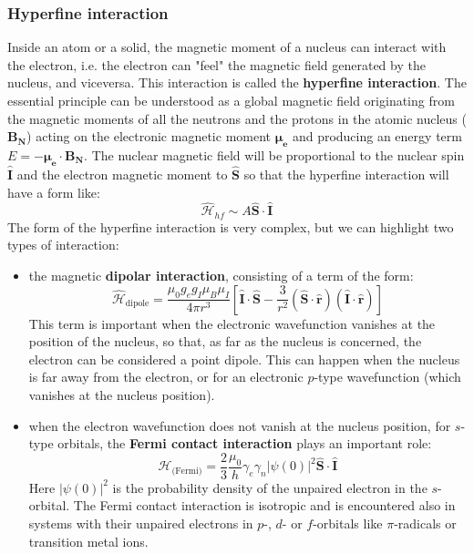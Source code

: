 \documentclass[a4paper,11pt]{article}
\begin{document}
\subsubsection{Hyperfine interaction}
Inside an atom or a solid, the magnetic moment of a nucleus can interact with the electron, i.e. the electron can "feel" the magnetic field generated by the nucleus, and viceversa. This interaction is called the {\bf hyperfine interaction}. The essential principle can be understood as a global magnetic field originating from the magnetic moments of all the neutrons and the protons in the atomic nucleus ($\mathbf{B_N}$) acting on the electronic magnetic moment $\mathbf{\mu_e}$ and producing an energy term $E = - \mathbf{\mu_e} \cdot \mathbf{B_N}$. The nuclear magnetic field will be proportional to the nuclear spin $\hat{\mathbf{I}}$ and the electron magnetic moment to $\hat{\mathbf{S}}$ so that the hyperfine interaction will have a form like:
\begin{equation}
    \hat{\mathcal{H}}_{hf} \sim A \hat{\mathbf{S}} \cdot \hat{\mathbf{I}}
\end{equation}
\newline The form of the hyperfine interaction is very complex, but we can highlight two types of interaction:
\begin{itemize}
    \item the magnetic {\bf dipolar interaction}, consisting of a term of the form:
    \begin{equation}
        \hat{\mathcal{H}}_{\mbox{dipole}} = \frac{\mu_0 g_e g_I \mu_B \mu_I}{4\pi r^3}\left[ \hat{\mathbf{I}} \cdot \hat{\mathbf{S}} - \frac{3}{r^2} \left( \hat{\mathbf{S}} \cdot \hat{\mathbf{r}}\right)\left( \hat{\mathbf{I}} \cdot \hat{\mathbf{r}}\right) \right]
    \end{equation}
    This term is important when the electronic wavefunction vanishes at the position of the nucleus, so that, as far as the nucleus is concerned, the electron can be considered a point dipole. This can happen when the nucleus is far away from the electron, or for an electronic $p$-type wavefunction (which vanishes at the nucleus position).
    \item when the electron wavefunction does not vanish at the nucleus position, for $s$-type orbitals, the {\bf Fermi contact interaction} plays an important role:
    \begin{equation}
        \mathcal{H}_{\mbox{(Fermi)}} = \frac{2}{3}\frac{\mu_0}{h} \gamma_e \gamma_n |\psi(0)|^2 \hat{\mathbf{S}} \cdot \hat{\mathbf{I}}
    \end{equation}
    Here $|\psi(0)|^2$ is the probability density of the unpaired electron in the $s$-orbital. The Fermi contact interaction is isotropic and is encountered also in systems with their unpaired electrons in $p$-, $d$- or $f$-orbitals like $\pi$-radicals or transition metal ions.
\end{itemize}
\end{document}

